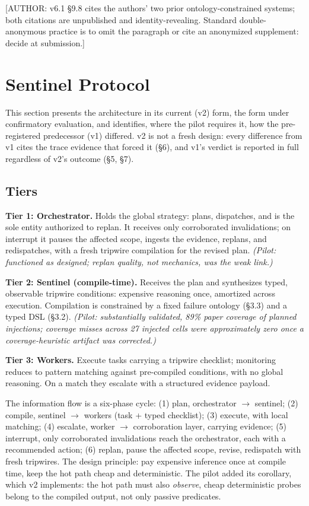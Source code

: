 \documentclass[acmsmall,screen,review,anonymous]{acmart}
\begin{document}
[AUTHOR: v6.1 \S9.8 cites the authors' two prior ontology-constrained systems; both citations are unpublished and identity-revealing. Standard double-anonymous practice is to omit the paragraph or cite an anonymized supplement: decide at submission.]

\section{Sentinel Protocol}
This section presents the architecture in its current (v2) form, the form under confirmatory evaluation, and identifies, where the pilot requires it, how the pre-registered predecessor (v1) differed. v2 is not a fresh design: every difference from v1 cites the trace evidence that forced it (\S6), and v1's verdict is reported in full regardless of v2's outcome (\S5, \S7).

\subsection{Tiers}
\textbf{Tier 1: Orchestrator.} Holds the global strategy: plans, dispatches, and is the sole entity authorized to replan. It receives only corroborated invalidations; on interrupt it pauses the affected scope, ingests the evidence, replans, and redispatches, with a fresh tripwire compilation for the revised plan. \emph{(Pilot: functioned as designed; replan quality, not mechanics, was the weak link.)}

\textbf{Tier 2: Sentinel (compile-time).} Receives the plan and synthesizes typed, observable tripwire conditions: expensive reasoning once, amortized across execution. Compilation is constrained by a fixed failure ontology (\S3.3) and a typed DSL (\S3.2). \emph{(Pilot: substantially validated, 89\% paper coverage of planned injections; coverage misses across 27 injected cells were approximately zero once a coverage-heuristic artifact was corrected.)}

\textbf{Tier 3: Workers.} Execute tasks carrying a tripwire checklist; monitoring reduces to pattern matching against pre-compiled conditions, with no global reasoning. On a match they escalate with a structured evidence payload.

The information flow is a six-phase cycle: (1) plan, orchestrator $\rightarrow$ sentinel; (2) compile, sentinel $\rightarrow$ workers (task + typed checklist); (3) execute, with local matching; (4) escalate, worker $\rightarrow$ corroboration layer, carrying evidence; (5) interrupt, only corroborated invalidations reach the orchestrator, each with a recommended action; (6) replan, pause the affected scope, revise, redispatch with fresh tripwires. The design principle: pay expensive inference once at compile time, keep the hot path cheap and deterministic. The pilot added its corollary, which v2 implements: the hot path must also \emph{observe}, cheap deterministic probes belong to the compiled output, not only passive predicates.
\end{document}
